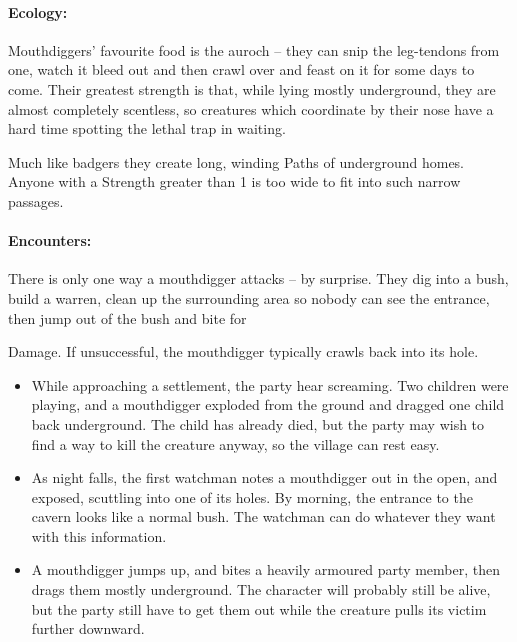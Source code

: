 \begin{multicols}{2}
\paragraph{Ecology:} Mouthdiggers' favourite food is the auroch -- they can snip the leg-tendons from one, watch it bleed out and then crawl over and feast on it for some days to come.
Their greatest strength is that, while lying mostly underground, they are almost completely scentless, so creatures which coordinate by their nose have a hard time spotting the lethal trap in waiting.

Much like badgers they create long, winding Paths of underground homes.  Anyone with a Strength greater than 1 is too wide to fit into such narrow passages.

\paragraph{Encounters:} There is only one way a mouthdigger attacks -- by surprise.  They dig into a bush, build a warren, clean up the surrounding area so nobody can see the entrance, then jump out of the bush and bite for \addtocounter{strb}{-5} Damage.  If unsuccessful, the mouthdigger typically crawls back into its hole.

\begin{itemize}

  \item{While approaching a settlement, the party hear screaming.
  Two children were playing, and a mouthdigger exploded from the ground and dragged one child back underground.
  The child has already died, but the party may wish to find a way to kill the creature anyway, so the village can rest easy.}
  \item{As night falls, the first watchman notes a mouthdigger out in the open, and exposed, scuttling into one of its holes.
  By morning, the entrance to the cavern looks like a normal bush.
  The watchman can do whatever they want with this information.}
  \item{A mouthdigger jumps up, and bites a heavily armoured party member, then drags them mostly underground.
  The character will probably still be alive, but the party still have to get them out while the creature pulls its victim further downward.}

\end{itemize}

\mouthdigger

\label{wolf}


\end{multicols}
